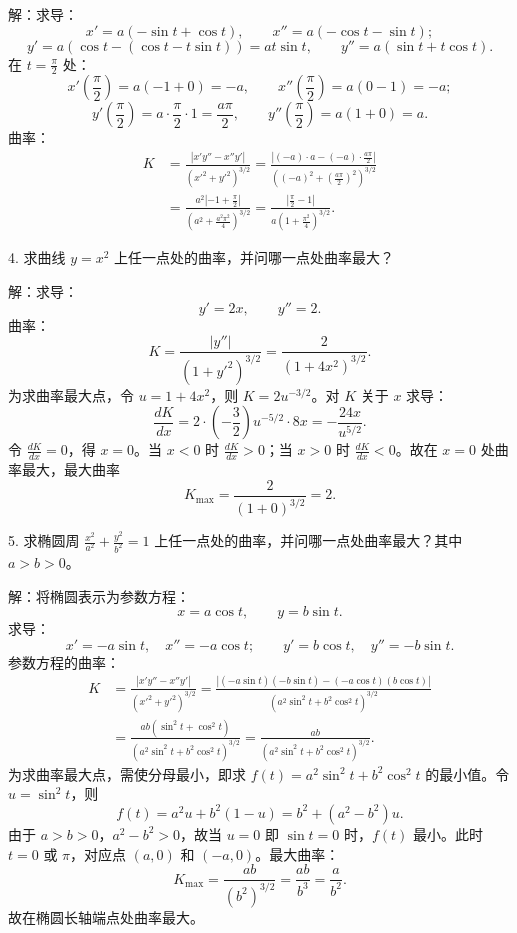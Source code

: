 解：求导：
\[ x'=a(-\sin t+\cos t),\qquad x''=a(-\cos t-\sin t); \]
\[ y'=a(\cos t-(\cos t-t\sin t))=at\sin t,\qquad y''=a(\sin t+t\cos t). \]
在 \(t=\frac{\pi}{2}\) 处：
\[ x'\left(\frac{\pi}{2}\right)=a(-1+0)=-a,\qquad x''\left(\frac{\pi}{2}\right)=a(0-1)=-a; \]
\[ y'\left(\frac{\pi}{2}\right)=a\cdot\frac{\pi}{2}\cdot 1=\frac{a\pi}{2},\qquad y''\left(\frac{\pi}{2}\right)=a(1+0)=a. \]
曲率：
\[ \begin{aligned} K&=\frac{|x'y''-x''y'|}{(x'^{2}+y'^{2})^{3/2}}
=\frac{\left|(-a)\cdot a-(-a)\cdot\frac{a\pi}{2}\right|}{\left((-a)^{2}+\left(\frac{a\pi}{2}\right)^{2}\right)^{3/2}}\\
&=\frac{a^{2}\left|-1+\frac{\pi}{2}\right|}{\left(a^{2}+\frac{a^{2}\pi^{2}}{4}\right)^{3/2}}
=\frac{\left|\frac{\pi}{2}-1\right|}{a\left(1+\frac{\pi^{2}}{4}\right)^{3/2}}. \end{aligned} \]

4. 求曲线 \(y=x^{2}\) 上任一点处的曲率，并问哪一点处曲率最大？

解：求导：
\[ y'=2x,\qquad y''=2. \]
曲率：
\[ K=\frac{|y''|}{(1+y'^{2})^{3/2}}=\frac{2}{(1+4x^{2})^{3/2}}. \]
为求曲率最大点，令 \(u=1+4x^{2}\)，则 \(K=2u^{-3/2}\)。对 \(K\) 关于 \(x\) 求导：
\[ \frac{dK}{dx}=2\cdot\left(-\frac{3}{2}\right)u^{-5/2}\cdot 8x=-\frac{24x}{u^{5/2}}. \]
令 \(\frac{dK}{dx}=0\)，得 \(x=0\)。当 \(x<0\) 时 \(\frac{dK}{dx}>0\)；当 \(x>0\) 时 \(\frac{dK}{dx}<0\)。故在 \(x=0\) 处曲率最大，最大曲率
\[ K_{\max}=\frac{2}{(1+0)^{3/2}}=2. \]

5. 求椭圆周 \(\frac{x^{2}}{a^{2}}+\frac{y^{2}}{b^{2}}=1\) 上任一点处的曲率，并问哪一点处曲率最大？其中 \(a>b>0\)。

解：将椭圆表示为参数方程：
\[ x=a\cos t,\qquad y=b\sin t. \]
求导：
\[ x'=-a\sin t,\quad x''=-a\cos t;\qquad y'=b\cos t,\quad y''=-b\sin t. \]
参数方程的曲率：
\[ \begin{aligned} K&=\frac{|x'y''-x''y'|}{(x'^{2}+y'^{2})^{3/2}}
=\frac{|(-a\sin t)(-b\sin t)-(-a\cos t)(b\cos t)|}{(a^{2}\sin^{2}t+b^{2}\cos^{2}t)^{3/2}}\\
&=\frac{ab(\sin^{2}t+\cos^{2}t)}{(a^{2}\sin^{2}t+b^{2}\cos^{2}t)^{3/2}}
=\frac{ab}{(a^{2}\sin^{2}t+b^{2}\cos^{2}t)^{3/2}}. \end{aligned} \]
为求曲率最大点，需使分母最小，即求 \(f(t)=a^{2}\sin^{2}t+b^{2}\cos^{2}t\) 的最小值。令 \(u=\sin^{2}t\)，则
\[ f(t)=a^{2}u+b^{2}(1-u)=b^{2}+(a^{2}-b^{2})u. \]
由于 \(a>b>0\)，\(a^{2}-b^{2}>0\)，故当 \(u=0\) 即 \(\sin t=0\) 时，\(f(t)\) 最小。此时 \(t=0\) 或 \(\pi\)，对应点 \((a,0)\) 和 \((-a,0)\)。最大曲率：
\[ K_{\max}=\frac{ab}{(b^{2})^{3/2}}=\frac{ab}{b^{3}}=\frac{a}{b^{2}}. \]
故在椭圆长轴端点处曲率最大。

